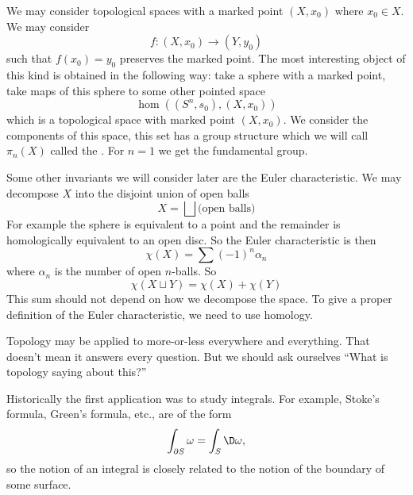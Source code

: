 We may consider topological spaces with a marked point $(X,x_{0})$
where $x_{0}\in X$. We may consider
\begin{equation}
f\colon (X,x_{0})\to (Y,y_{0})
\end{equation}
such that $f(x_{0})=y_{0}$ preserves the marked point. The most
interesting object of this kind is obtained in the following way:
take a sphere with a marked point, take maps of this sphere to
some other pointed space
\begin{equation}
\hom\left((S^{n},s_{0}),(X,x_{0})\right)
\end{equation}
which is a topological space with marked point $(X,x_{0})$.
We consider the components of this space, this set has a group
structure which we will call $\pi_{n}(X)$ called the
. For $n=1$ we get the fundamental group.

Some other invariants we will consider later are the Euler
characteristic. We may decompose $X$ into the disjoint union of
open balls
\begin{equation}
X=\bigsqcup\mbox{(open balls)}
\end{equation}
For example the sphere is equivalent to a point and the remainder
is homologically equivalent to an open disc. So the Euler
characteristic is then
\begin{equation}
\chi(X)=\sum(-1)^{n}\alpha_{n}
\end{equation}
where $\alpha_{n}$ is the number of open $n$-balls. So
\begin{equation}
\chi(X\sqcup Y)=\chi(X)+\chi(Y)
\end{equation}
This sum should not depend on how we decompose the space. To give
a proper definition of the Euler characteristic, we need to use
homology.

Topology may be applied to more-or-less everywhere and
everything. That doesn't mean it answers every question. But we
should ask ourselves ``What is topology saying about this?''

Historically the first application was to study integrals. For
example, Stoke's formula, Green's formula, etc., are of the form
\begin{equation}
\int_{\partial S}\omega=\int_{S}\D\omega,
\end{equation}
so the notion of an integral is closely related to the notion of
the boundary of some surface.

